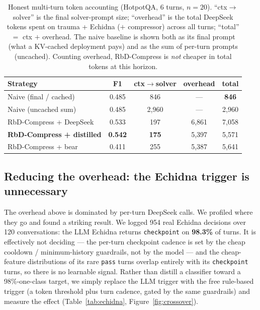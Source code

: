 \documentclass{article}
\begin{document}
\begin{table}[t]
\caption{Honest multi-turn token accounting (HotpotQA, 6 turns, $n=20$).
``ctx$\rightarrow$solver'' is the final solver-prompt size; ``overhead'' is
the total DeepSeek tokens spent on trauma + Echidna ($+$ compressor) across
all turns; ``total'' $=$ ctx $+$ overhead. The naive baseline is shown both
as its final prompt (what a KV-cached deployment pays) and as the sum of
per-turn prompts (uncached). Counting overhead, RbD-Compress is \emph{not}
cheaper in total tokens at this horizon.}
\label{tab:overhead}
\centering
\begin{tabular}{lcccc}
\toprule
Strategy & F1 & ctx$\rightarrow$solver & overhead & total \\
\midrule
Naive (final / cached)        & 0.485 & 846  & ---  & \textbf{846} \\
Naive (uncached sum)          & 0.485 & 2{,}960 & --- & 2{,}960 \\
RbD-Compress + DeepSeek       & 0.533 & 197  & 6{,}861 & 7{,}058 \\
\textbf{RbD-Compress + distilled} & \textbf{0.542} & \textbf{175} & 5{,}397 & 5{,}571 \\
RbD-Compress + bear           & 0.411 & 255  & 5{,}387 & 5{,}641 \\
\bottomrule
\end{tabular}
\end{table}

\subsection{Reducing the overhead: the Echidna trigger is unnecessary}
\label{sec:echidna-ablation}

The overhead above is dominated by per-turn DeepSeek calls. We profiled where they go and
found a striking result. We logged 954 real Echidna decisions over 120 conversations: the
LLM Echidna returns \texttt{checkpoint} on \textbf{98.3\%} of turns. It is effectively not
deciding --- the per-turn checkpoint cadence is set by the cheap cooldown / minimum-history
guardrails, not by the model --- and the cheap-feature distributions of its rare
\texttt{pass} turns overlap entirely with its \texttt{checkpoint} turns, so there is no
learnable signal. Rather than distill a classifier toward a 98\%-one-class target, we simply
replace the LLM trigger with the free rule-based trigger (a token threshold plus turn cadence,
gated by the same guardrails) and measure the effect
(Table~\ref{tab:echidna}, Figure~\ref{fig:crossover}).
\end{document}
